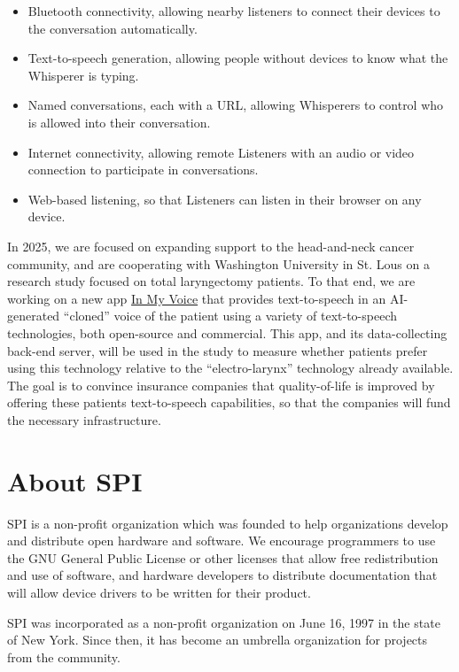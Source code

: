 \documentclass[a4paper]{report}
\begin{document}
\begin{itemize}

\item Bluetooth connectivity, allowing nearby listeners to connect their devices to the conversation automatically.
\item Text-to-speech generation, allowing people without devices to know what the Whisperer is typing.
\item Named conversations, each with a URL, allowing Whisperers to control who is allowed into their conversation.
\item Internet connectivity, allowing remote Listeners with an audio or video connection to participate in conversations.
\item Web-based listening, so that Listeners can listen in their browser on any device.

\end{itemize}

In 2025, we are focused on expanding support to the head-and-neck cancer community, and are cooperating with Washington University in St. Lous on a research study focused on total laryngectomy patients. To that end, we are working on a new app \href{https://apps.apple.com/us/app/in-my-voice/id6742593911}{In My Voice} that provides text-to-speech in an AI-generated “cloned” voice of the patient using a variety of text-to-speech technologies, both open-source and commercial. This app, and its data-collecting back-end server, will be used in the study to measure whether patients prefer using this technology relative to the “electro-larynx” technology already available. The goal is to convince insurance companies that quality-of-life is improved by offering these patients text-to-speech capabilities, so that the companies will fund the necessary infrastructure.


\appendix
\chapter{About SPI}

SPI is a non-profit organization which was founded to help organizations develop and distribute open hardware and software. We encourage programmers to use the GNU General Public License or other licenses that allow free redistribution and use of software, and hardware developers to distribute documentation that will allow device drivers to be written for their product.

SPI was incorporated as a non-profit organization on June 16, 1997 in the state of New York. Since then, it has become an umbrella organization for projects from the community.
\end{document}
